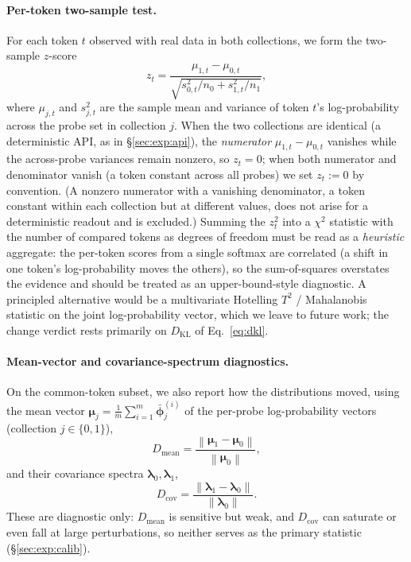 \documentclass[11pt]{article}
\newcommand{\norm}[1]{\left\lVert #1 \right\rVert}
\theoremstyle{definition}
\begin{document}
\paragraph{Per-token two-sample test.}
For each token $t$ observed with real data in both collections, we form the
two-sample $z$-score
\begin{equation}
  z_t = \frac{\mu_{1,t} - \mu_{0,t}}{\sqrt{s_{0,t}^2/n_0 + s_{1,t}^2/n_1}},
  \label{eq:z}
\end{equation}
where $\mu_{j,t}$ and $s_{j,t}^2$ are the sample mean and variance of token
$t$'s log-probability across the probe set in collection $j$. When the two
collections are identical (a deterministic API, as in \S\ref{sec:exp:api}), the
\emph{numerator} $\mu_{1,t}-\mu_{0,t}$ vanishes while the across-probe variances
remain nonzero, so $z_t = 0$; when both numerator and denominator vanish (a
token constant across all probes) we set $z_t := 0$ by convention. (A nonzero
numerator with a vanishing denominator, a token constant within each collection
but at different values, does not arise for a deterministic readout and is
excluded.) Summing the
$z_t^2$ into a $\chi^2$ statistic with the number of
compared tokens as degrees of freedom must be read as a \emph{heuristic}
aggregate: the per-token scores from a
single softmax are correlated (a shift in one token's log-probability moves the
others), so the sum-of-squares overstates the evidence and should be treated as
an upper-bound-style diagnostic. A principled alternative would be a
multivariate Hotelling $T^2$ / Mahalanobis statistic on the joint log-probability
vector, which we leave to future work; the change verdict rests primarily on
$D_{\mathrm{KL}}$ of Eq.~\eqref{eq:dkl}.

\paragraph{Mean-vector and covariance-spectrum diagnostics.}
On the common-token subset, we also report how the distributions moved, using
the mean vector $\bm{\mu}_j = \tfrac1m \sum_{i=1}^m \bar{\bm{\phi}}^{(i)}_j$ of
the per-probe log-probability vectors (collection $j \in \{0,1\}$),
\begin{equation}
  D_{\mathrm{mean}} = \frac{\norm{\bm{\mu}_1 - \bm{\mu}_0}}{\norm{\bm{\mu}_0}} ,
  \label{eq:dmean}
\end{equation}
and their covariance spectra $\bm{\lambda}_0, \bm{\lambda}_1$,
\begin{equation}
  D_{\mathrm{cov}} = \frac{\norm{\bm{\lambda}_1 - \bm{\lambda}_0}}{\norm{\bm{\lambda}_0}} .
  \label{eq:dcov}
\end{equation}
These are diagnostic only: $D_{\mathrm{mean}}$ is sensitive but weak, and
$D_{\mathrm{cov}}$ can saturate or even fall at large perturbations, so neither
serves as the primary statistic (\S\ref{sec:exp:calib}).
\end{document}
